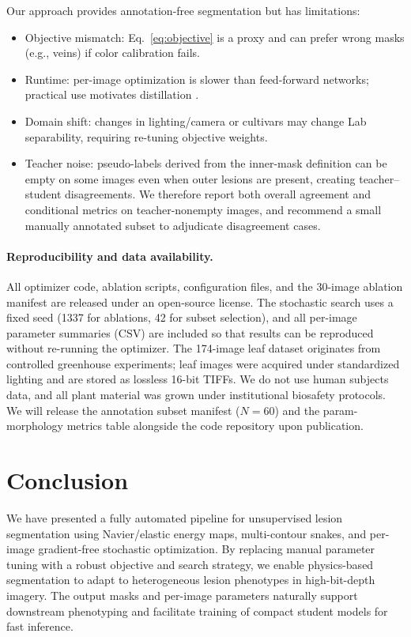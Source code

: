 \documentclass[journal]{IEEEtran}
\begin{document}
Our approach provides annotation-free segmentation but has limitations:
\begin{itemize}
    \item Objective mismatch: Eq.~\eqref{eq:objective} is a proxy and can prefer wrong masks (e.g., veins) if color calibration fails.
    \item Runtime: per-image optimization is slower than feed-forward networks; practical use motivates distillation \cite{hinton2015distilling}.
    \item Domain shift: changes in lighting/camera or cultivars may change Lab separability, requiring re-tuning objective weights.
    \item Teacher noise: pseudo-labels derived from the inner-mask definition can be empty on some images even when outer lesions are present, creating teacher--student disagreements. We therefore report both overall agreement and conditional metrics on teacher-nonempty images, and recommend a small manually annotated subset to adjudicate disagreement cases.
\end{itemize}
\paragraph{Reproducibility and data availability.}
All optimizer code, ablation scripts, configuration files, and the 30-image ablation manifest are released under an open-source license. The stochastic search uses a fixed seed (1337 for ablations, 42 for subset selection), and all per-image parameter summaries (CSV) are included so that results can be reproduced without re-running the optimizer. The 174-image leaf dataset originates from controlled greenhouse experiments; leaf images were acquired under standardized lighting and are stored as lossless 16-bit TIFFs. We do not use human subjects data, and all plant material was grown under institutional biosafety protocols. We will release the annotation subset manifest ($N{=}60$) and the param-morphology metrics table alongside the code repository upon publication.

\section{Conclusion}
We have presented a fully automated pipeline for unsupervised lesion segmentation using Navier/elastic energy maps, multi-contour snakes, and per-image gradient-free stochastic optimization. By replacing manual parameter tuning with a robust objective and search strategy, we enable physics-based segmentation to adapt to heterogeneous lesion phenotypes in high-bit-depth imagery. The output masks and per-image parameters naturally support downstream phenotyping and facilitate training of compact student models for fast inference.



\end{document}
